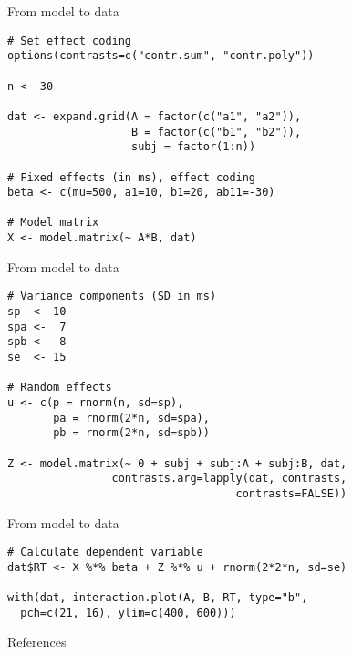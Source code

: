 \documentclass{beamer}
\begin{document}
{

\begin{frame}[fragile]{From model to data}
  \begin{lstlisting}
# Set effect coding 
options(contrasts=c("contr.sum", "contr.poly"))

n <- 30

dat <- expand.grid(A = factor(c("a1", "a2")), 
                   B = factor(c("b1", "b2")),
                   subj = factor(1:n))

# Fixed effects (in ms), effect coding
beta <- c(mu=500, a1=10, b1=20, ab11=-30)

# Model matrix 
X <- model.matrix(~ A*B, dat)
  \end{lstlisting}
\end{frame}

\begin{frame}[fragile]{From model to data}
  \begin{lstlisting}
# Variance components (SD in ms)
sp  <- 10
spa <-  7
spb <-  8
se  <- 15

# Random effects
u <- c(p = rnorm(n, sd=sp), 
       pa = rnorm(2*n, sd=spa), 
       pb = rnorm(2*n, sd=spb))

Z <- model.matrix(~ 0 + subj + subj:A + subj:B, dat, 
                contrasts.arg=lapply(dat, contrasts,
                                   contrasts=FALSE))
  \end{lstlisting}
\end{frame}


\begin{frame}[fragile]{From model to data}
  \begin{lstlisting}
# Calculate dependent variable
dat$RT <- X %*% beta + Z %*% u + rnorm(2*2*n, sd=se)

with(dat, interaction.plot(A, B, RT, type="b", 
  pch=c(21, 16), ylim=c(400, 600)))
  \end{lstlisting}
  \nocite{Wickelmaier2020}
\end{frame}

}

% 
% 
% 

\appendix
\begin{frame}{References}


\vfill
\end{frame}
\end{document}
